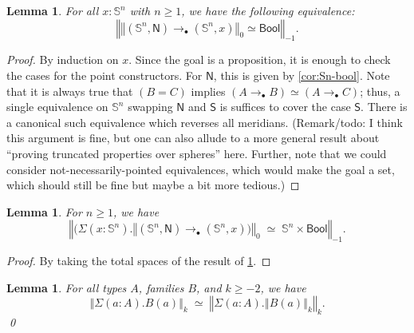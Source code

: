 \documentclass[11pt,a4paper,oneside,reqno]{amsart}
\newtheorem{lemma}[theorem]{Lemma}
\theoremstyle{definition}
\theoremstyle{remark}
\newcommand{\sph}[1]{{\mathbb S}^{#1}}
\newcommand{\trunc}[2]{\mathopen{}\left\Vert #2\right\Vert_{#1}\mathclose{}}
\newcommand{\North}{\mathsf N}
\newcommand{\South}{\mathsf S}
\begin{document}
\begin{lemma} \label{lem:eqv-to-bool}
 For all $x : \sph n$ with $n \geq 1$, we have the following equivalence:
 \begin{equation}
  \trunc {-1} {\trunc 0 {(\sph n, \North) \to_\bullet (\sph n, x)} \simeq \mathsf{Bool}}.
 \end{equation}
\end{lemma}
\begin{proof}
 By induction on $x$.
 Since the goal is a proposition, it is enough to check the cases for the point constructors. For $\North$, this is given by 
 \cref{cor:Sn-bool}. Note that it is always true that $(B = C)$ implies $(A \to_\bullet B) \simeq (A \to_\bullet C)$;
 thus, a single equivalence on $\sph n$ swapping $\North$ and $\South$ is suffices to cover the case $\South$.
 There is a canonical such equivalence which reverses all meridians.
 (Remark/todo: I think this argument is fine, but one can also allude to a more general result about ``proving truncated properties over spheres'' here. Further, note that we could consider not-necessarily-pointed equivalences, which would make the goal a set, which should still be fine but maybe a bit more tedious.)
\end{proof}

\begin{lemma} \label{lem:sn-bool}
 For $n \geq 1$, we have
 \begin{equation}
  \trunc {-1} {\big(\Sigma (x : \sph n). \trunc 0 {(\sph n , \North) \to_\bullet (\sph n, x)\big)} \; \simeq \; \sph n \times \mathsf{Bool}}.
 \end{equation}
\end{lemma}
\begin{proof}
 By taking the total spaces of the result of \cref{lem:eqv-to-bool}.
\end{proof}

\begin{lemma} \label{lem:rm-truncs}
 For all types $A$, families $B$, and $k \geq -2$, we have
 \begin{equation}
  \trunc k {\Sigma (a : A). B(a)} \; \simeq \; \trunc k {\Sigma (a : A). \trunc k {B(a)}}.
 \end{equation}
 \qed
\end{lemma}
\end{document}
